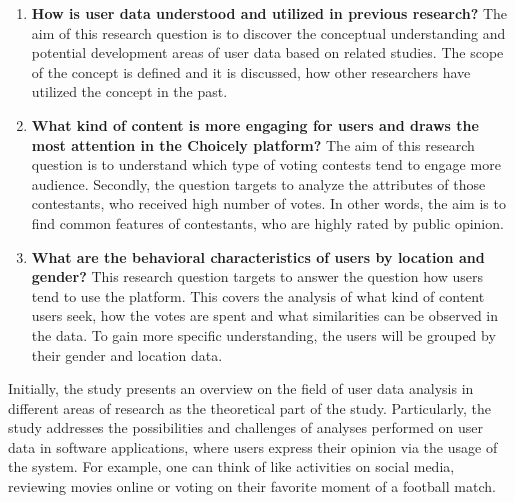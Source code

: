     \begin{enumerate}[label=RQ\arabic*:]
        \item \textbf{How is user data understood and utilized in previous research?} The aim of this research question is to discover the conceptual understanding and potential development areas of user data based on related studies. The scope of the concept is defined and it is discussed, how other researchers have utilized the concept in the past.
        
        \item \textbf{What kind of content is more engaging for users and draws the most attention in the Choicely platform?} The aim of this research question is to understand which type of voting contests tend to engage more audience. Secondly, the question targets to analyze the attributes of those contestants, who received high number of votes. In other words, the aim is to find common features of contestants, who are highly rated by public opinion.

        \item \textbf{What are the behavioral characteristics of users by location and gender?} This research question targets to answer the question how users tend to use the platform. This covers the analysis of what kind of content users seek, how the votes are spent and what similarities can be observed in the data. To gain more specific understanding, the users will be grouped by their gender and location data.



    \end{enumerate}

    Initially, the study presents an overview on the field of user data analysis in different areas of research as the theoretical part of the study. Particularly, the study addresses the possibilities and challenges of analyses performed on user data in software applications, where users express their opinion via the usage of the system. For example, one can think of like activities on social media, reviewing movies online or voting on their favorite moment of a football match.

